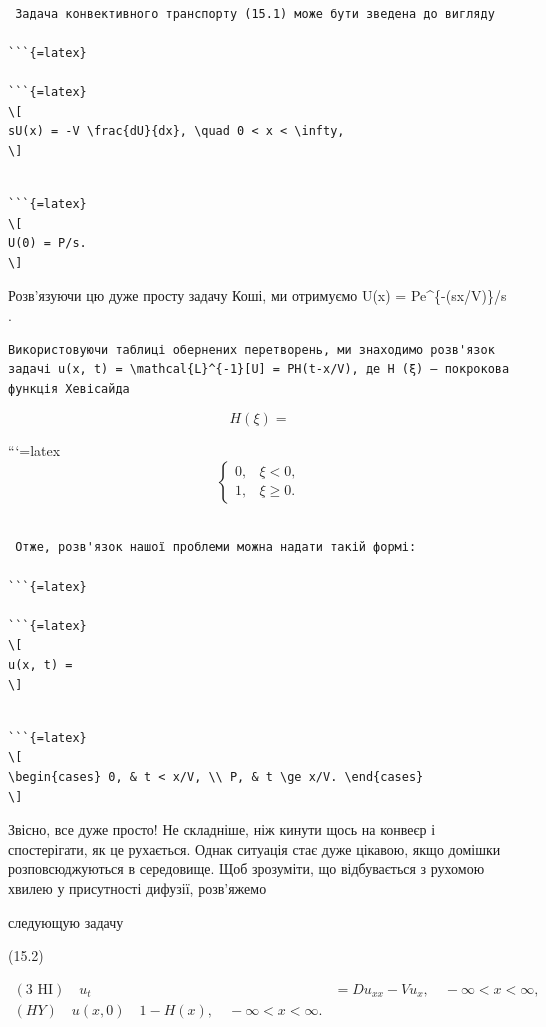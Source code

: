 \documentclass[
  ukrainian,
]{article}
\begin{document}
\begin{verbatim}

 Задача конвективного транспорту (15.1) може бути зведена до вигляду

```{=latex}

```{=latex}
\[
sU(x) = -V \frac{dU}{dx}, \quad 0 < x < \infty,
\]
\end{verbatim}

\begin{verbatim}

```{=latex}
\[
U(0) = P/s.
\]
\end{verbatim}

Розв'язуючи цю дуже просту задачу Коші, ми отримуємо U(x) =
Pe\^{}\{-(sx/V)\}/s .

\begin{verbatim}
Використовуючи таблиці обернених перетворень, ми знаходимо розв'язок задачі u(x, t) = \mathcal{L}^{-1}[U] = PH(t-x/V), де H (ξ) — покрокова функція Хевісайда
\end{verbatim}

\[
H(\xi) =
\]

```{=latex}
\[
\begin{cases} 0, & \xi < 0, \\ 1, & \xi \geqslant 0. \end{cases}
\]

\begin{verbatim}

 Отже, розв'язок нашої проблеми можна надати такій формі:

```{=latex}

```{=latex}
\[
u(x, t) =
\]
\end{verbatim}

\begin{verbatim}

```{=latex}
\[
\begin{cases} 0, & t < x/V, \\ P, & t \ge x/V. \end{cases}
\]
\end{verbatim}

Звісно, все дуже просто! Не складніше, ніж кинути щось на конвеєр і
спостерігати, як це рухається. Однак ситуація стає дуже цікавою, якщо
домішки розповсюджуються в середовище. Щоб зрозуміти, що відбувається з
рухомою хвилею у присутності дифузії, розв'яжемо

следующую задачу

(15.2)

\[
\begin{aligned} (3 \text{ HI}) \quad u_t &= Du_{xx} - Vu_x, \quad -\infty < x < \infty, \\ (HY) \quad u(x, 0) \quad 1 - H(x), \quad -\infty < x < \infty. \end{aligned}
\]
\end{document}
